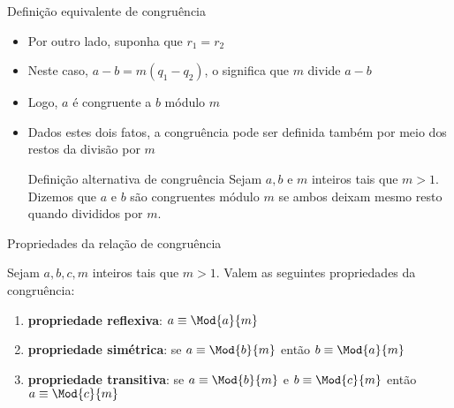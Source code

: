 \begin{frame}[fragile]{Definição equivalente de congruência}

    \begin{itemize}
        \item Por outro lado, suponha que $r_1 = r_2$

        \item Neste caso, $a - b = m(q_1 - q_2)$, o significa que $m$ divide $a - b$

        \item Logo, $a$ é congruente a $b$ módulo $m$

        \item Dados estes dois fatos, a congruência pode ser definida também por meio dos
            restos da divisão por $m$

        \vspace{0.1in}

        \begin{block}{Definição alternativa de congruência}
            Sejam $a, b$ e $m$ inteiros tais que $m > 1$. Dizemos que $a$ e $b$ são congruentes 
            módulo $m$ se ambos deixam mesmo resto quando divididos por $m$.
        \end{block}
    \end{itemize}

\end{frame}

\begin{frame}[fragile]{Propriedades da relação de congruência}

    Sejam $a, b, c, m$ inteiros tais que $m > 1$. Valem as seguintes propriedades da congruência:

    \begin{enumerate}
        \item \textbf{propriedade reflexiva}: $a\equiv \Mod{a}{m}$
        \item \textbf{propriedade simétrica}: se $a\equiv \Mod{b}{m}$ então $b\equiv \Mod{a}{m}$
        \item \textbf{propriedade transitiva}: se $a\equiv \Mod{b}{m}$ e $b\equiv \Mod{c}{m}$ então
            $a\equiv \Mod{c}{m}$
    \end{enumerate}

\end{frame}

